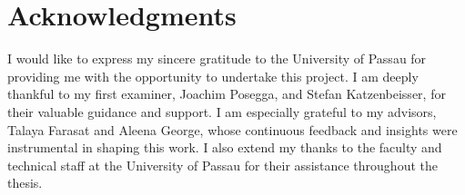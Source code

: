 \chapter*{Acknowledgments}

I would like to express my sincere gratitude to the University of Passau for providing me with the opportunity to undertake this project. I am deeply thankful to my first examiner, Joachim Posegga, and Stefan Katzenbeisser, for their valuable guidance and support. I am especially grateful to my advisors, Talaya Farasat and Aleena George, whose continuous feedback and insights were instrumental in shaping this work. I also extend my thanks to the faculty and technical staff at the University of Passau for their assistance throughout the thesis.
